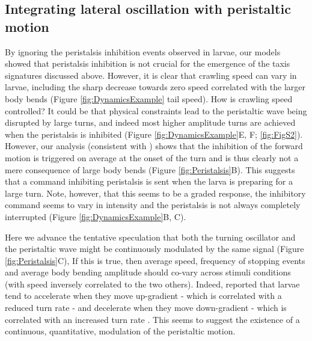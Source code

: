 \documentclass[11pt,a4paper]{article}
\begin{document}
\subsection{Integrating lateral oscillation with peristaltic motion}
By ignoring the peristalsis inhibition events observed in larvae, our models showed that peristalsis inhibition is not crucial for the emergence of the taxis signatures discussed above. However, it is clear that crawling speed can vary in larvae, including the sharp decrease towards zero speed correlated with the larger body bends (Figure \ref{fig:DynamicsExample} tail speed). How is crawling speed controlled? It could be that physical constraints lead to the peristaltic wave being disrupted by large turns, and indeed most higher amplitude turns are achieved when the peristalsis is inhibited (Figure \ref{fig:DynamicsExample}E, F; \ref{fig:FigS2}). However, our analysis (consistent with \citet{gepner2015computations,hernandez2015reverse}) shows that the inhibition of the forward motion is triggered on average at the onset of the turn and is thus clearly not a mere consequence of large body bends (Figure \ref{fig:Peristalsis}B). This suggests that a  command inhibiting peristalsis is sent when the larva is preparing for a large turn. Note, however, that this seems to be a graded response, the inhibitory command seems to vary in intensity and the peristalsis is not always completely interrupted (Figure \ref{fig:DynamicsExample}B, C).

Here we advance the tentative speculation that both the turning oscillator and the peristaltic wave might be continuously modulated by the same signal (Figure \ref{fig:Peristalsis}C), 
If this is true, then average speed, frequency of stopping events and average body bending amplitude should co-vary across stimuli conditions (with speed inversely correlated to the two others). Indeed, \cite{gomez2014multilevel} reported that larvae tend to accelerate when they move up-gradient - which is correlated with a reduced turn rate \citep{schleyer2015learning} - and decelerate when they move down-gradient - which is correlated with an increased turn rate \citep{schleyer2015learning}. This seems to suggest the existence of a continuous, quantitative, modulation of the peristaltic motion. 
\end{document}
